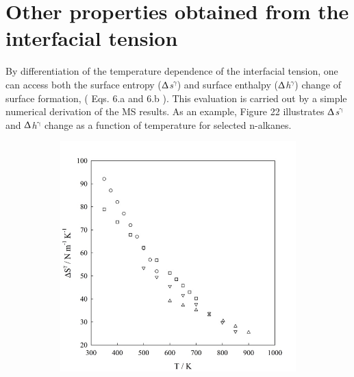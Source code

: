 \documentclass{scrbook}
\begin{document}
\section{Other properties obtained from the interfacial tension}

By differentiation of the temperature dependence of the interfacial tension,
one can access both  the surface entropy (${\Updelta}$\textit{s}$^{{\gamma}}$)
and surface enthalpy (${\Updelta}$\textit{h}$^{{\gamma}}$) change of surface
formation, ( Eqs. 6.a and 6.b ). This evaluation is carried out by a simple
numerical derivation of the MS results. As an example, Figure 22 illustrates
${\Updelta}$\textit{s}$^{\mathrm{{\gamma}}}$ and
${\Updelta}$\textit{h}$^{\mathrm{{\gamma}}}$ change as a function of
temperature for selected n-alkanes.

\begin{figure}
	\centering
	\begin{subfigure}{0.4\textwidth} %
    \includegraphics[width=1\textwidth]{gfx/image68.jpeg}
	\end{subfigure}
	\begin{subfigure}{0.4\textwidth} %

\end{subfigure}
\end{figure}
\end{document}
